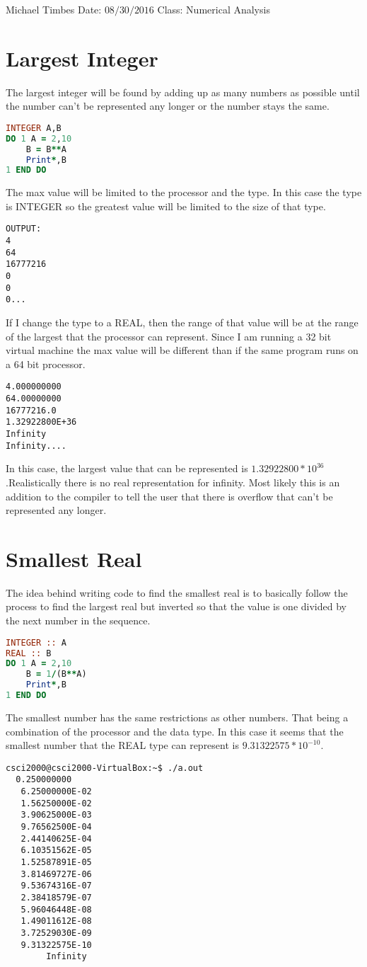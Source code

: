 \documentclass[12pt]{article}
\author{Michael Timbes}
\date{\today}
\begin{document}
\flushleft Michael Timbes\newline
Date: $08/30/2016$ \newline
Class: Numerical Analysis
\section{Largest Integer}
The largest integer will be found by adding up as many numbers as possible until the number can't be represented any longer or the number stays the same. 
\begin{lstlisting}[language= Fortran]
INTEGER A,B
DO 1 A = 2,10
	B = B**A
	Print*,B
1 END DO

\end{lstlisting}
The max value will be limited to the processor and the type. In this case the type is INTEGER so the greatest value will be limited to the size of that type.
\begin{verbatim}
OUTPUT: 
4
64
16777216
0
0
0...
\end{verbatim}
If I change the type to a REAL, then the range of that value will be at the range of the largest that the processor can represent. Since I am running a 32 bit virtual machine the max value will be different than if the same program runs on a 64 bit processor. 
\begin{verbatim}
4.000000000
64.00000000
16777216.0
1.32922800E+36
Infinity
Infinity....
\end{verbatim}
In this case, the largest value that can be represented is $1.32922800*10^{36}$.Realistically there is no real representation for infinity. Most likely this is an addition to the compiler to tell the user that there is overflow that can't be represented any longer. 
\section{Smallest Real}
The idea behind writing code to find the smallest real is to basically follow the process to find the largest real but inverted so that the value is one divided by the next number in the sequence. 
\begin{lstlisting}[language= Fortran]
INTEGER :: A
REAL :: B
DO 1 A = 2,10
	B = 1/(B**A)
	Print*,B
1 END DO

\end{lstlisting}
The smallest number has the same restrictions as other numbers. That being a combination of the processor and the data type. In this case it seems that the smallest number that the REAL type can represent is $9.31322575*10^{-10}$.
\begin{verbatim}
csci2000@csci2000-VirtualBox:~$ ./a.out
  0.250000000    
   6.25000000E-02
   1.56250000E-02
   3.90625000E-03
   9.76562500E-04
   2.44140625E-04
   6.10351562E-05
   1.52587891E-05
   3.81469727E-06
   9.53674316E-07
   2.38418579E-07
   5.96046448E-08
   1.49011612E-08
   3.72529030E-09
   9.31322575E-10
     	Infinity

\end{verbatim}
\end{document}
